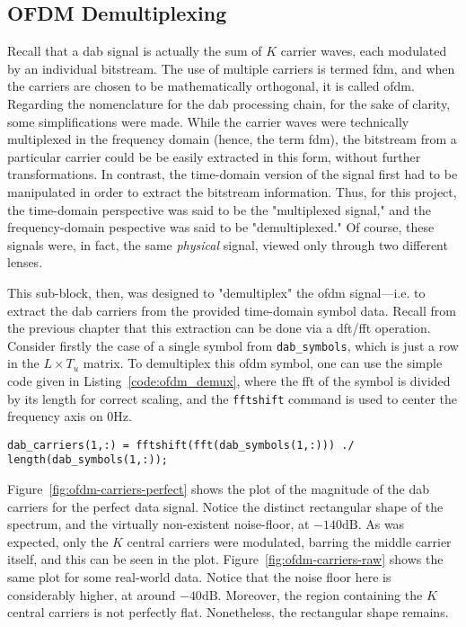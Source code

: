 \documentclass[class=report,11pt,crop=false]{standalone}
\begin{document}
\subsection{OFDM Demultiplexing \label{subsect:dab-proc_ofdm-demux}}
Recall that a \gls{dab} signal is actually the sum of \(K\) carrier waves, each modulated by an individual bitstream. The use of multiple carriers is termed \acrlong{fdm}, and when the carriers are chosen to be mathematically orthogonal, it is called \acrlong{ofdm}. Regarding the nomenclature for the \gls{dab} processing chain, for the sake of clarity, some simplifications were made. While the carrier waves were technically multiplexed in the frequency domain (hence, the term \acrshort{fdm}), the bitstream from a particular carrier could be be easily extracted in this form, without further transformations. In contrast, the time-domain version of the signal first had to be manipulated in order to extract the bitstream information. Thus, for this project, the time-domain perspective was said to be the "multiplexed signal," and the frequency-domain pespective was said to be "demultiplexed." Of course, these signals were, in fact, the same \emph{physical} signal, viewed only through two different lenses.

This sub-block, then, was designed to "demultiplex" the \gls{ofdm} signal---i.e. to extract the \gls{dab} carriers from the provided time-domain symbol data. Recall from the previous chapter that this extraction can be done via a \gls{dft}/\gls{fft} operation. Consider firstly the case of a single symbol from \texttt{dab\_symbols}, which is just a row in the \(L \times T_u\) matrix. To demultiplex this \gls{ofdm} symbol, one can use the simple code given in Listing~\ref{code:ofdm_demux}, where the \gls{fft} of the symbol is divided by its length for correct scaling, and the \texttt{fftshift} command is used to center the frequency axis on \(0\si{\hertz}\).

\begin{lstlisting}[caption={MATLAB code for demultiplexing an \gls{ofdm} symbol}, label={code:ofdm_demux}]
dab_carriers(1,:) = fftshift(fft(dab_symbols(1,:))) ./ length(dab_symbols(1,:));
\end{lstlisting}

Figure~\ref{fig:ofdm-carriers-perfect} shows the plot of the magnitude of the \gls{dab} carriers for the perfect data signal. Notice the distinct rectangular shape of the spectrum, and the virtually non-existent noise-floor, at \(-140\si{\deci\bel}\). As was expected, only the \(K\) central carriers were modulated, barring the middle carrier itself, and this can be seen in the plot. Figure~\ref{fig:ofdm-carriers-raw} shows the same plot for some real-world data. Notice that the noise floor here is considerably higher, at around \(-40\si{\deci\bel}\). Moreover, the region containing the \(K\) central carriers is not perfectly flat. Nonetheless, the rectangular shape remains.
\end{document}
